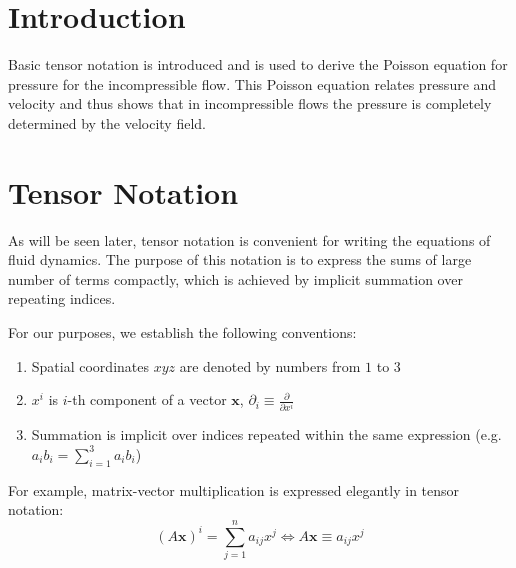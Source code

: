 

\section{Introduction}
 
Basic tensor notation is introduced and is used to derive the Poisson equation for pressure for the incompressible flow. This Poisson equation relates pressure and velocity and thus shows that in incompressible flows the pressure is completely determined by the velocity field.
 
% 
% 
% 
% 

\section{Tensor Notation}

As will be seen later, tensor notation is convenient for writing the equations of fluid dynamics. The purpose of this notation is 
to express the sums of large number of terms compactly, which is achieved by implicit summation over repeating indices.

For our purposes, we establish the following conventions: 
\begin{enumerate}
 \item Spatial coordinates $xyz$ are denoted by numbers from $1$ to $3$
 \item $x^i$ is $i$-th component of a vector $\mathbf{x}$, $\partial_i \equiv \frac{\partial}{\partial x^i}$
 \item Summation is implicit over indices repeated within the same expression (e.g. $a_ib_i = \sum_{i=1}^{3}a_ib_i$)
\end{enumerate}

For example, matrix-vector multiplication is expressed elegantly in tensor notation: $$(A\mathbf{x})^i = \sum_{j=1}^{n}a_{ij}x^j \Longleftrightarrow A\mathbf{x} \equiv a_{ij}x^j$$

